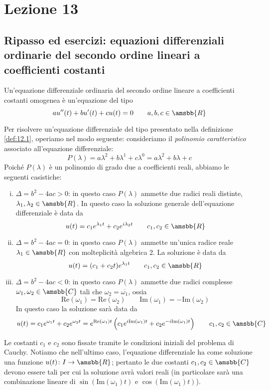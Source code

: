 \section{Lezione 13}
\subsection{Ripasso ed esercizi: equazioni differenziali ordinarie del secondo ordine lineari a coefficienti costanti}
\begin{definition}
    \label{def:12.1}
    Un'equazione differenziale ordinaria del secondo ordine lineare a coefficienti costanti omogenea è un'equazione del tipo
    \[
    au''(t)+bu'(t)+cu(t) = 0 \qquad a,b,c\in\amsbb{R}
    \]
\end{definition}
Per risolvere un'equazione differenziale del tipo presentato nella definizione \ref{def:12.1}, operiamo nel modo seguente: consideriamo il \emph{polinomio caratteristico} associato all'equazione differenziale:
\[
P(\lambda) = a \lambda^2 +b\lambda^1 + c \lambda^0 = a\lambda^2 +b\lambda + c
\]
Poiché $P(\lambda)$ è un polinomio di grado due a coefficienti reali, abbiamo le seguenti casistiche:
\begin{enumerate}[(i)]
    \item $\Delta = b^2-4ac>0$: in questo caso $P(\lambda)$ ammette due radici reali distinte, $\lambda_1, \lambda_2\in\amsbb{R}$. In questo caso la soluzione generale dell'equazione differenziale è data da
    \[
    u(t) = c_1 e^{\lambda_1 t} + c_2 e^{i\lambda_2 t} \qquad c_1, c_2\in\amsbb{R}
    \]
    \item $\Delta = b^2-4ac = 0$: in questo caso $P(\lambda)$ ammette un'unica radice reale $\lambda_1\in\amsbb{R}$ con molteplicità algebrica 2. La soluzione è data da
    \[
    u(t) = (c_1 +c_2 t)e^{\lambda_1 t} \qquad c_1, c_2\in\amsbb{R}
    \]
    \item $\Delta= b^2-4ac<0$: in questo caso $P(\lambda)$ ammette due radici complesse $\omega_1, \omega_2\in\amsbb{C}$ tali che $\omega_2 = \overline{\omega_1}$, ossia
    \[
    \text{Re}(\omega_1) = \text{Re}(\omega_2) \qquad \text{Im}(\omega_1) = -\text{Im}(\omega_2)
    \]
    In questo caso la soluzione sarà data da
    \[
    u(t) = c_1 e^{\omega_1 t} + c_2 e^{\omega_2 t} = e^{\text{Re}(\omega_1)t}\left(c_1 e^{i\text{Im}(\omega_1)t} + c_2 e^{-i \text{Im}(\omega_1)t}\right) \qquad c_1, c_2\in\amsbb{C}
    \]
\end{enumerate}
\begin{remark}
    Le costanti $c_1$ e $c_2$ sono fissate tramite le condizioni iniziali del problema di Cauchy. Notiamo che nell'ultimo caso, l'equazione differenziale ha come soluzione una funzione $u(t)\colon I \to \amsbb{R}$; pertanto le due costanti $c_1, c_2\in\amsbb{C}$ devono essere tali per cui la soluzione avrà valori reali (in particolare sarà una combinazione lineare di $\sin(\text{Im}(\omega_1)t)$ e $\cos(\text{Im}(\omega_1)t)$).
\end{remark}
